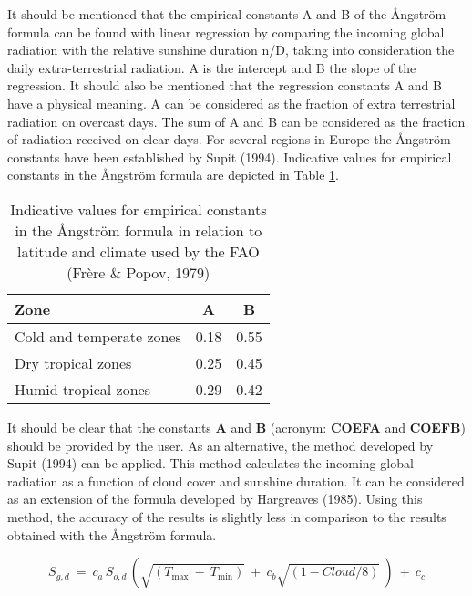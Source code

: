 It should be mentioned that the empirical constants A and B of the \AA ngstr\"{o}m formula 
can be found with linear regression by comparing the incoming global radiation with the
relative sunshine duration n/D, taking into consideration the daily extra-terrestrial
radiation. A is the intercept and B the slope of the regression. It should also be mentioned
that the regression constants A and B have a physical meaning. A can be considered as
the fraction of extra terrestrial radiation on overcast days. The sum of A and B can be
considered as the fraction of radiation received on clear days.
For several regions in Europe the \AA ngstr\"{o}m constants have been established by Supit
(1994). Indicative values for empirical constants in the \AA ngstr\"{o}m formula are 
depicted in Table \ref{tab:angstAB}.

\begin{table}
	\centering
	\caption{Indicative values for empirical constants in the \AA ngstr\"{o}m formula in
		relation to latitude and climate used by the FAO (Fr\`{e}re \& Popov, 1979)}
	\label{tab:angstAB}
	\begin{tabular}{lcc}
		\hline
		Zone &   A &  B  \\
		\hline
		Cold and temperate zones   &  0.18 &  0.55\\
		Dry tropical zones  &   0.25  & 0.45\\
		Humid tropical zones  &   0.29 &  0.42\\
		\hline
	\end{tabular}
\end{table}

It should be clear that the constants {\bf A} and {\bf B} (acronym: {\bf COEFA} and {\bf COEFB}) should be
provided by the user. As an alternative, the method developed by Supit
(1994) can be applied. This method calculates the incoming global
radiation as a function of cloud cover and sunshine duration. It can be considered as an
extension of the formula developed by Hargreaves (1985). 
Using this method, the accuracy of the results is slightly less in comparison to 
the results obtained with the \AA ngstr\"{o}m formula.

\begin{equation}
S _{g,d} ~=~ c _{a} \, S _{o,d} \, (\sqrt{(T _{\max} ~-~T _{\min} )} ~+~ 
c _{b} \sqrt{(1-{Cloud/8})} ~) ~+~c _{c} 
\end{equation}

